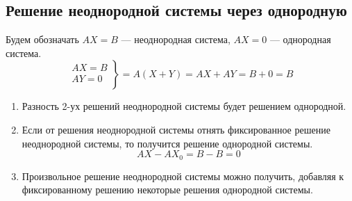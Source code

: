 \documentclass[a4paper, 12pt]{article}
\begin{document}
\subsection*{Решение неоднородной системы через однородную}
Будем обозначать $AX=B$ --- неоднородная система, $AX=0$ --- однородная система.
$$\left.
  \begin{array}{ccc}
    AX=B \\
    AY=0 \\
  \end{array}
\right\}=A(X+Y)=AX+AY=B+0=B$$
\begin{enumerate}
    \item Разность 2-ух решений неоднородной системы будет решением однородной.
    \item Если от решения неоднородной системы отнять фиксированное решение неоднородной системы, то получится решение однородной системы.
    $$AX-AX_0=B-B=0$$
    \item Произвольное решение неоднородной системы можно получить, добавляя к фиксированному решению некоторые решения однородной системы.
\end{enumerate}
\end{document}
